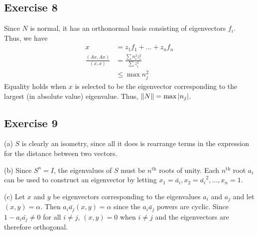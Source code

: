 \subsection{Exercise 8}
Since  $N$ is normal, it has an orthonormal basis consisting of eigenvectors $f_i$. Thus, we have
\begin{align*}
        x &= z_1 f_1 + ... + z_n f_n \\
        \frac{(Ax, Ax)}{(x, x)} &= \frac{\sum n_i^2 z_i^2}{\sum z_i^2} \\
                                &\leq \max n_j^2
\end{align*}
Equality holds when $x$ is selected to be the eigenvector corresponding to the largest (in absolute value) 
eigenvalue. Thus, $\norm{N} = \max \abs{n_j}$.

\subsection{Exercise 9}
(a) $S$ is clearly an isometry, since all it does is rearrange terms in the expression for the distance
between two vectors.

(b) Since $S^n = I$, the eigenvalues of $S$ must be $n^{\text{th}}$ roots of unity. Each $n^{\text{th}}$ 
root $a_i$ can be used to construct an eigenvector by letting $x_1 = \bar{a_i}, x_2 = \bar{a_i}^2, ..., x_n = 1$.

(c) Let $x$ and $y$ be eigenvectors corresponding to the eigenvalues $a_i$ and $a_j$ and let $(x, y) = \alpha$.
Then $a_i \bar{a_j} (x, y) = \alpha$ since the $a_i \bar{a_j}$ powers are cyclic. 
Since $1 - a_i \bar{a_j} \neq 0$ for all $i \neq  j$, $(x, y) = 0$ when $i \neq j$ and the eigenvectors are
therefore orthogonal.


